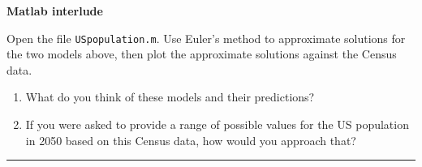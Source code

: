 \documentclass[12pt,letterpaper,noanswers]{exam}
\begin{document}
\noindent\textbf{Matlab interlude}

Open the file \texttt{USpopulation.m}.  Use Euler's method to approximate solutions for the two models above, then plot the approximate solutions against the Census data.  
\begin{enumerate}
    \item What do you think of these models and their predictions?
    \vspace{1in}

    \item If you were asked to provide a range of possible values for the US population in 2050 based on this Census data, how would you approach that?
        \vspace{1in}
        
\end{enumerate}





\vspace{0.2cm}
\hrule
\vspace{0.2cm}




\end{document}
